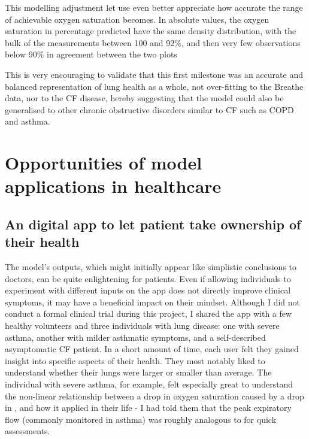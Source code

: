 This modelling adjustment let use even better appreciate how accurate the range of achievable oxygen saturation becomes. In absolute values, the oxygen saturation in percentage predicted have the same density distribution, with the bulk of the measurements between 100 and 92\%, and then very few observations below 90\% in agreement between the two plots



This is very encouraging to validate that this first milestone was an accurate and balanced representation of lung health as a whole, not over-fitting to the Breathe data, nor to the CF disease, hereby suggesting that the model could also be generalised to other chronic obstructive disorders similar to CF such as COPD and asthma.

\section{Opportunities of model applications in healthcare}

\subsection{An digital app to let patient take ownership of their health}
The model's outputs, which might initially appear like simplistic conclusions to doctors, can be quite enlightening for patients. Even if allowing individuals to experiment with different inputs on the app does not directly improve clinical symptoms, it may have a beneficial impact on their mindset. Although I did not conduct a formal clinical trial during this project, I shared the app with a few healthy volunteers and three individuals with lung disease: one with severe asthma, another with milder asthmatic symptoms, and a self-described asymptomatic CF patient. In a short amount of time, each user felt they gained insight into specific aspects of their health. They most notably liked to understand whether their lungs were larger or smaller than average. The individual with severe asthma, for example, felt especially great to understand the non-linear relationship between a drop in oxygen saturation caused by a drop in \F, and how it applied in their life - I had told them that the peak expiratory flow (commonly monitored in asthma) was roughly analogous to \F for quick assessments.

